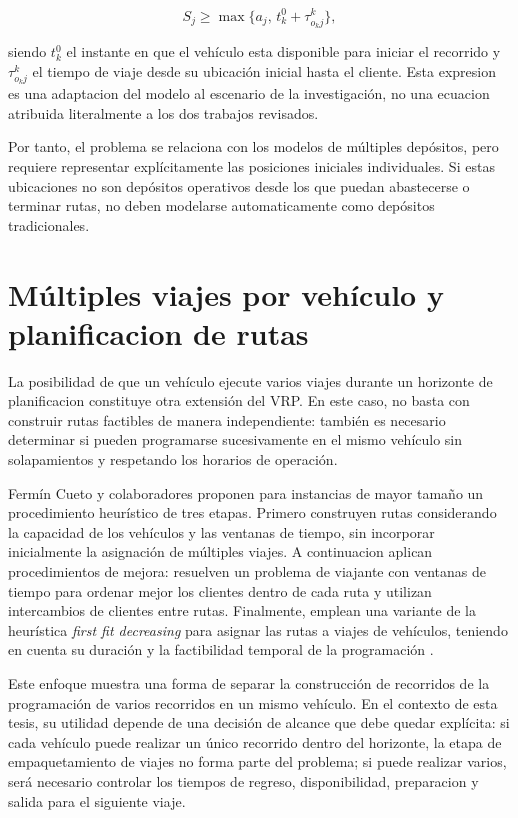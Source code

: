 \begin{equation}
S_j \geq \max\{a_j,\,t_k^0+\tau_{o_kj}^{k}\},
\label{eq:origen_individual}
\end{equation}

siendo $t_k^0$ el instante en que el vehículo esta disponible para iniciar el recorrido y $\tau_{o_kj}^{k}$ el tiempo de viaje desde su ubicación inicial hasta el cliente. Esta expresion es una adaptacion del modelo al escenario de la investigación, no una ecuacion atribuida literalmente a los dos trabajos revisados.

Por tanto, el problema se relaciona con los modelos de múltiples depósitos, pero requiere representar explícitamente las posiciones iniciales individuales. Si estas ubicaciones no son depósitos operativos desde los que puedan abastecerse o terminar rutas, no deben modelarse automaticamente como depósitos tradicionales.

\section{Múltiples viajes por vehículo y planificacion de rutas}
\label{sec:multi_trip}

La posibilidad de que un vehículo ejecute varios viajes durante un horizonte de planificacion constituye otra extensión del VRP. En este caso, no basta con construir rutas factibles de manera independiente: también es necesario determinar si pueden programarse sucesivamente en el mismo vehículo sin solapamientos y respetando los horarios de operación.

Fermín Cueto y colaboradores proponen para instancias de mayor tamaño un procedimiento heurístico de tres etapas. Primero construyen rutas considerando la capacidad de los vehículos y las ventanas de tiempo, sin incorporar inicialmente la asignación de múltiples viajes. A continuacion aplican procedimientos de mejora: resuelven un problema de viajante con ventanas de tiempo para ordenar mejor los clientes dentro de cada ruta y utilizan intercambios de clientes entre rutas. Finalmente, emplean una variante de la heurística \textit{first fit decreasing} para asignar las rutas a viajes de vehículos, teniendo en cuenta su duración y la factibilidad temporal de la programación \cite{fermincueto2021}.

Este enfoque muestra una forma de separar la construcción de recorridos de la programación de varios recorridos en un mismo vehículo. En el contexto de esta tesis, su utilidad depende de una decisión de alcance que debe quedar explícita: si cada vehículo puede realizar un único recorrido dentro del horizonte, la etapa de empaquetamiento de viajes no forma parte del problema; si puede realizar varios, será necesario controlar los tiempos de regreso, disponibilidad, preparacion y salida para el siguiente viaje.

